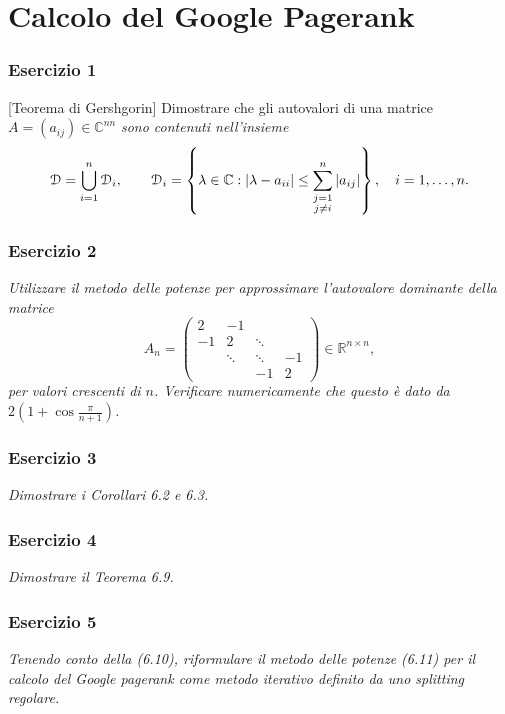 \chapter{Calcolo del Google Pagerank}
\label{chap:Google}

\subsection{Esercizio 1}
\label{sub:Es1}
[Teorema di Gershgorin]
      Dimostrare che gli autovalori di una matrice
      $A=(a_{ij})\in\mathbb{C}^{n n}$
      \emph{sono contenuti nell'insieme}
			\[
				\mathcal{D}=\bigcup_{i=1}^n\mathcal{D}_i,\qquad \mathcal{D}_i=\left\{\lambda\in\mathbb{C}:|\lambda-a_{ii}|\leq\sum_{\begin{subarray}{c}
					j=1\\
					j\neq i
				\end{subarray}}^n|a_{ij}|\right\},\quad i=1,\dots,n.
			\]

\subsection{Esercizio 2}
\label{sub:Es2}
\emph{
      Utilizzare il metodo delle potenze per approssimare l'autovalore dominante della matrice
			\[
				A_n=\begin{pmatrix}
					2 & -1 & &\\
					-1 & 2 & \ddots &\\
					& \ddots & \ddots & -1\\
					& & -1 & 2
				\end{pmatrix}\in\mathbb{R}^{n\times n},
			\]
			per valori crescenti di $n$. Verificare numericamente che questo è dato da $2\left(1+\cos\frac{\pi}{n+1}\right)$.
}

\subsection{Esercizio 3}
\label{sub:es3}
\emph{Dimostrare i Corollari 6.2 e 6.3.}

\subsection{Esercizio 4}
\label{sub:es4}
\emph{Dimostrare il Teorema 6.9.}

\subsection{Esercizio 5}
\label{sub:es5}
\emph{Tenendo conto della (6.10), riformulare il metodo delle potenze (6.11) per il calcolo del \textit{Google pagerank} come metodo iterativo definito da uno splitting regolare.}

